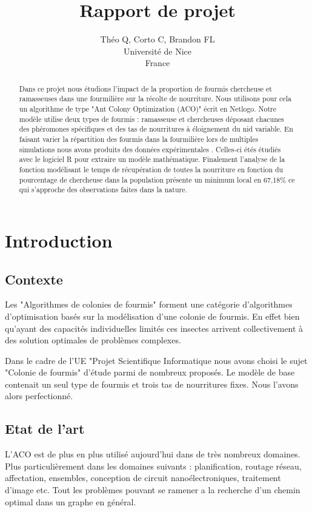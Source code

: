 \documentclass{article}
\title{Rapport de projet}
\author{Théo Q, Corto C, Brandon FL \\
Université de Nice\\
France}
\begin{document}
\maketitle


\begin{abstract}
Dans ce projet nous étudions l'impact de la proportion de fourmis chercheuse et ramasseuses dans une fourmilière sur la récolte de nourriture. Nous utilisons pour cela un algorithme de type "Ant Colony Optimization (ACO)" écrit en Netlogo. Notre modèle utilise deux types de fourmis : ramasseuse et chercheuses déposant chacunes des phéromones spécifiques et des tas de nourritures à éloignement du nid variable. En faisant varier la répartition des fourmis dans la fourmilière lors de multiples simulations nous avons produits des données expérimentales . Celles-ci étés  étudiés avec le logiciel R pour extraire un modèle mathématique. Finalement l'analyse de la fonction modélisant le temps de récupération de toutes la nourriture en fonction du pourcentage de chercheuse dans la population présente un minimum local en 67,18\% ce qui s'approche des observations faites dans la nature.
\end{abstract}
\section{Introduction}
\subsection{Contexte}
Les "Algorithmes de colonies de fourmis" forment une catégorie d'algorithmes d'optimisation basés sur la modélisation d'une colonie de fourmis. En effet bien qu'ayant des capacités individuelles limités ces insectes arrivent collectivement à des solution optimales de problèmes complexes. 



Dans le cadre de l'UE "Projet Scientifique Informatique nous avons choisi le sujet "Colonie de fourmis" d'étude parmi de nombreux proposés. Le modèle de base contenait un seul type de fourmis et trois tas de nourritures fixes. Nous l'avons alors perfectionné.
\subsection{Etat de l'art}
L'ACO est de plus en plus utilisé aujourd'hui dans de très nombreux domaines. Plus particulièrement dans les domaines suivants : planification, routage réseau, affectation, ensembles, conception de circuit nanoélectroniques, traitement d'image etc. Tout les problèmes pouvant se ramener a la recherche d'un chemin optimal dans un graphe en général.
\end{document}
